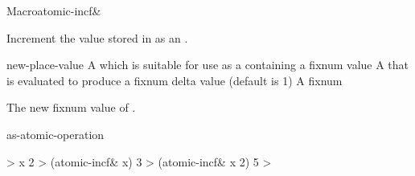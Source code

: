 \documentclass[10pt,twoside,english,pdftex]{article}
\begin{document}
\begin{functiondoc}{Macro}{atomic-incf\&}{ 
    }
%

\fnsyntax \fnpurpose Increment the  value stored in
 as an .

\fnpackage {}

\fnmodule {}

\fnargs
\begin{args}{new-place-value}
\arg[place] A  which is suitable for use as a
 containing a fixnum value
 A  that is evaluated to produce a fixnum delta
value (default is 1)
 A fixnum
\end{args}

\fnreturns The new fixnum value of . 

\begin{alsos}{as-atomic-operation}
\end{alsos}

\fnexamples
%
\W\supp
\begin{example}
  > x
  2
  > (atomic-incf\& x)
  3
  > (atomic-incf\& x 2)
  5
  >
\end{example}

\end{functiondoc}

\end{document}
